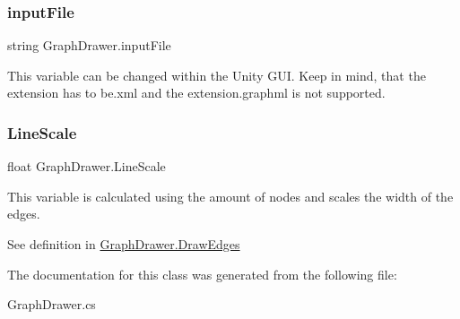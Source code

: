 \subsubsection{\texorpdfstring{inputFile}{inputFile}}
{\footnotesize\ttfamily string Graph\+Drawer.\+input\+File}



This variable can be changed within the Unity G\+UI. Keep in mind, that the extension has to be.\+xml and the extension.\+graphml is not supported. 

\mbox{\label{class_graph_drawer_aa5ef4a330d302c0d55a33376a4727edf}} 
\subsubsection{\texorpdfstring{LineScale}{LineScale}}
{\footnotesize\ttfamily float Graph\+Drawer.\+Line\+Scale}



This variable is calculated using the amount of nodes and scales the width of the edges. 

See definition in \mbox{\hyperlink{class_graph_drawer_ad4bde4b9d817629c77bc1e8818e5cd69}{Graph\+Drawer.\+Draw\+Edges}} 

The documentation for this class was generated from the following file\+:\begin{DoxyCompactItemize}
\item 
Graph\+Drawer.\+cs\end{DoxyCompactItemize}

